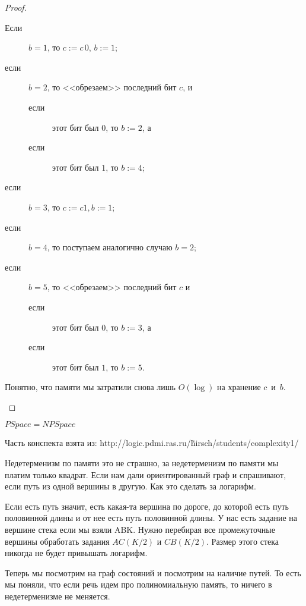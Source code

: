 \begin{proof}
\begin{enumerate}
{		\begin{description}
		\item[Если] $b=1$, то $c:=c\,0$, $b:=1$;	
		\item[если] $b=2$, то <<обрезаем>> последний бит $c$, и 
			\begin{description}
			\item[если] этот бит был $0$, то $b:=2$, а
			\item[если] этот бит был $1$, то $b:=4$;
			\end{description}
		\item[если] $b=3$, то $c:=c1, b:=1$;
		\item[если] $b=4$, то поступаем аналогично случаю $b=2$;
		\item[если] $b=5$, то <<обрезаем>> последний бит $c$ и
	\begin{description}
	\item[если] этот бит был $0$, то $b:=3$, а
	\item[если] этот бит был $1$, то $b:=5$.
	\end{description}
\end{description}
Понятно, что памяти мы затратили снова лишь $O(\log)$ на хранение $c$~и~$b$.
}
\end{enumerate}
\end{proof}

\begin{conseq}                                          	
	$PSpace = NPSpace$\\
\end{conseq}

\begin{Rem}
	Часть конспекта взята из: http://logic.pdmi.ras.ru/\~hirsch/students/complexity1/
\end{Rem}

Недетерменизм по памяти это не страшно, за недетерменизм по памяти мы платим только квадрат. Если нам 
дали ориентированный граф и спрашивают, если путь из одной вершины в другую. Как это сделать за логарифм. 

Если есть путь значит, есть какая-та вершина по дороге, до которой есть путь половинной длины и от нее есть путь 
половинной длины. У нас есть задание на вершине стека если мы взяли ABK. Нужно перебирая все промежуточные вершины обработать задания  
$AC(K/2)$ и $CB(K/2)$. Размер этого стека никогда не будет привышать логарифм.

Теперь мы посмотрим на граф состояний и посмотрим на наличие путей. То есть мы поняли, что
если речь идем про полиномиальную память, то ничего в недетерменизме не меняется.  
